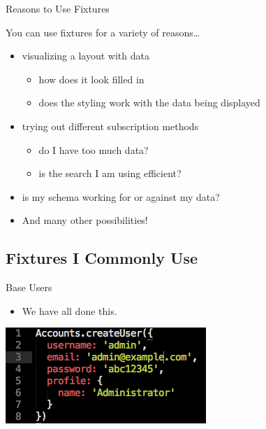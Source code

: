 \documentclass{beamer}
\begin{document}
\begin{frame}{Reasons to Use Fixtures}

  You can use fixtures for a variety of reasons\dots
  \begin{itemize}
  \pause
  \item visualizing a layout with data
    \begin{itemize}
    \pause
    \item
      how does it look filled in
      \pause
    \item    
      does the styling work with the data being displayed
    \end{itemize}
    \pause
  \item
    trying out different subscription methods
    \begin{itemize}
    \pause
    \item
      do I have too much data?
      \pause
    \item
      is the search I am using efficient?
    \end{itemize}
    \pause
    \item is my schema working for or against my data?
  \item
    And many other possibilities!
    
  \end{itemize}
\end{frame}


\subsection{Fixtures I Commonly Use}

\begin{frame}{Base Users}
\begin{itemize}
  \item We have all done this.
\end{itemize}
\includegraphics[width=0.5\columnwidth]{admin-fixture.png}

\end{frame}
\end{document}
